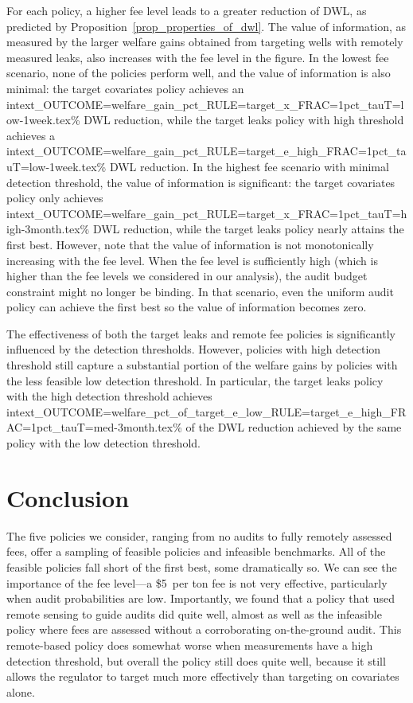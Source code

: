 For each policy, a higher fee level leads to a greater reduction of \gls{DWL}, as predicted by Proposition~\ref{prop_properties_of_dwl}.
The value of information, as measured by the larger welfare gains obtained from targeting wells with remotely measured leaks, also increases with the fee level in the figure.
In the lowest fee scenario, none of the policies perform well, and the value of information is also minimal: the target covariates policy achieves an
{intext_OUTCOME=welfare_gain_pct_RULE=target_x_FRAC=1pct_tauT=low-1week.tex}\%
\gls{DWL} reduction, while the target leaks policy with high threshold achieves a
{intext_OUTCOME=welfare_gain_pct_RULE=target_e_high_FRAC=1pct_tauT=low-1week.tex}\% \gls{DWL} reduction.
In the highest fee scenario with minimal detection threshold, the value of information is significant: the target covariates policy only achieves
{intext_OUTCOME=welfare_gain_pct_RULE=target_x_FRAC=1pct_tauT=high-3month.tex}\%
\gls{DWL} reduction, while the target leaks policy nearly attains the first best.
However, note that the value of information is not monotonically increasing with the fee level.
When the fee level is sufficiently high (which is higher than the fee levels we considered in our analysis), the audit budget constraint might no longer be binding.
In that scenario, even the uniform audit policy can achieve the first best so the value of information becomes zero.

The effectiveness of both the target leaks and remote fee policies is significantly influenced by the detection thresholds.
However, policies with high detection threshold still capture a substantial portion of the welfare gains by policies with the less feasible low detection threshold.
In particular, the target leaks policy with the high detection threshold achieves
{intext_OUTCOME=welfare_pct_of_target_e_low_RULE=target_e_high_FRAC=1pct_tauT=med-3month.tex}\%
of the \gls{DWL} reduction achieved by the same policy with the low detection threshold.

\iftoggle{endfloat}{}{\FloatBarrier} %

\section{Conclusion}
\label{sec:conclusion}


The five policies we consider, ranging from no audits to fully remotely assessed fees, offer a sampling of feasible policies and infeasible benchmarks.
All of the feasible policies fall short of the first best, some dramatically so.
We can see the importance of the fee level---a \$5~per ton  fee is not very effective, particularly when audit probabilities are low.
Importantly, we found that a policy that used remote sensing to guide audits did quite well, almost as well as the infeasible policy where fees are assessed without a corroborating on-the-ground audit.
This remote-based policy does somewhat worse when measurements have a high detection threshold, but overall the policy still does quite well, because it still allows the regulator to target much more effectively than targeting on covariates alone.

